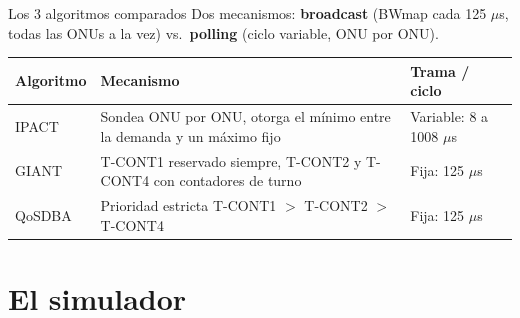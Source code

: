 \documentclass[aspectratio=169,t]{beamer}
\begin{document}
\begin{frame}{Los 3 algoritmos comparados}
    Dos mecanismos: \textbf{broadcast} (BWmap cada 125 $\mu$s, todas las ONUs a la vez)
    vs.\ \textbf{polling} (ciclo variable, ONU por ONU).
    \vspace{0.15cm}
    \begin{table}
        \footnotesize
        \renewcommand{\arraystretch}{1.4}
        \begin{tabular}{lp{5.2cm}l}
            \toprule
            Algoritmo & Mecanismo & Trama / ciclo \\
            \midrule
            IPACT & Sondea ONU por ONU, otorga el mínimo entre la demanda y un máximo fijo & Variable: 8 a 1008 $\mu$s \\
            GIANT & T-CONT1 reservado siempre, T-CONT2 y T-CONT4 con contadores de turno & Fija: 125 $\mu$s \\
            QoSDBA & Prioridad estricta T-CONT1 $>$ T-CONT2 $>$ T-CONT4 & Fija: 125 $\mu$s \\
            \bottomrule
        \end{tabular}
    \end{table}

\end{frame}

\section{El simulador}
\end{document}
